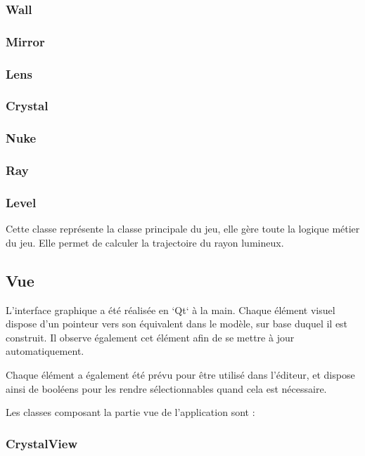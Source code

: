 \documentclass[]{article}
\begin{document}
\subsubsection{Wall}
\subsubsection{Mirror}
\subsubsection{Lens}
\subsubsection{Crystal}
\subsubsection{Nuke}
\subsubsection{\label{Ray}Ray}


\subsubsection{\label{Level}Level}

Cette classe représente la classe principale du jeu, elle gère toute 
la logique métier du jeu. Elle permet de calculer la trajectoire
du rayon lumineux.
	
\subsection{Vue}

L’interface graphique a été réalisée en `Qt` à la main. Chaque élément visuel dispose d’un pointeur vers son
équivalent dans le modèle, sur base duquel il est construit. Il observe également cet élément afin de se mettre
à jour automatiquement.

Chaque élément a également été prévu pour être utilisé dans l’éditeur, et dispose ainsi de booléens pour les rendre 
sélectionnables quand cela est nécessaire.

Les classes composant la partie vue de l’application sont :

\subsubsection{CrystalView}
\end{document}
